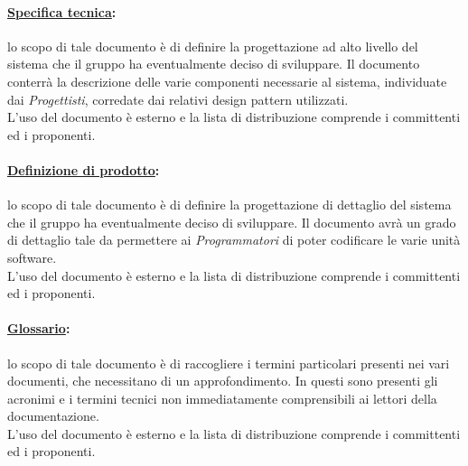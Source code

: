 \paragraph{\underline{Specifica tecnica}:} lo scopo di tale documento è di definire la progettazione ad alto livello del sistema che il gruppo \authorName{} ha eventualmente deciso di sviluppare. Il documento conterrà la descrizione delle varie componenti necessarie al sistema, individuate dai \textit{Progettisti}, corredate dai relativi design pattern\g{} utilizzati.\\
L'uso del documento è esterno e la lista di distribuzione comprende i committenti ed i proponenti.

\paragraph{\underline{Definizione di prodotto}:} lo scopo di tale documento è di definire la progettazione di dettaglio del sistema che il gruppo \authorName{} ha eventualmente deciso di sviluppare. Il documento avrà un grado di dettaglio tale da permettere ai \textit{Programmatori} di poter codificare le varie unità software.\\
L'uso del documento è esterno e la lista di distribuzione comprende i committenti ed i proponenti.

\paragraph{\underline{Glossario}:} lo scopo di tale documento è di raccogliere i termini particolari presenti nei vari documenti, che necessitano di un approfondimento. In questi sono presenti gli acronimi e i termini tecnici non immediatamente comprensibili ai lettori della documentazione.\\
L'uso del documento è esterno e la lista di distribuzione comprende i committenti ed i proponenti.

